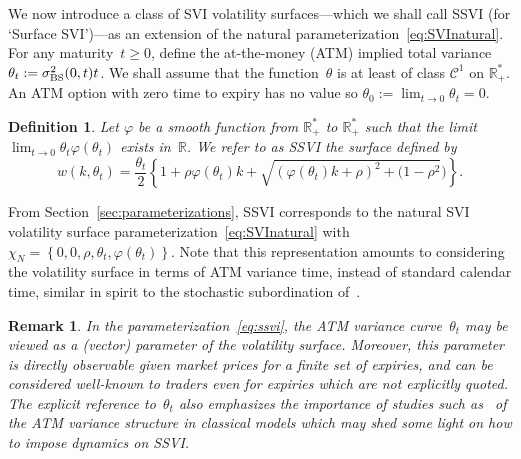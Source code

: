 \documentclass[12pt]{article}
\newtheorem{definition}{Definition}[section]
\newtheorem{remark}{Remark}[section]
\numberwithin{equation}{section}
\newcommand{\R}{\mathbb{R}}
\newcommand{\BS}{\rm BS}
\newcommand{\beq}{\begin{equation}}
\newcommand{\eeq}{\end{equation}}
\begin{document}
We now introduce a class of SVI volatility surfaces---which we shall call SSVI (for `Surface SVI')---as 
an extension of the natural parameterization~\eqref{eq:SVInatural}.
For any maturity~$t\geq 0$, define the at-the-money (ATM) implied total variance~$\theta_t:=\sigma_{\BS}^2(0,t)t$.
We shall assume that the function~$\theta$ is at least of class $\mathcal{C}^1$ on $\R_+^*$.
An ATM option with zero time to expiry has no value so $\theta_0:=\lim_{t\to 0}\theta_t=0$.
\begin{definition}
Let $\varphi$ be a smooth function from $\R_+^*$ to $\R_+^*$  such that the limit 
$\lim_{t\to 0}\theta_t\varphi(\theta_t)$ exists in~$\mathbb{R}$.
We refer to as {\em SSVI} the surface defined by
\beq\label{eq:ssvi}
w(k,\theta_t)
= \frac{\theta_t}{2}\left\{1+\rho\varphi(\theta_t) k + \sqrt{\left(\varphi(\theta_t){k}+\rho\right)^2
+(1-\rho^2 })\right\}.
\eeq
\end{definition}
From Section~\ref{sec:parameterizations}, SSVI corresponds to 
the natural SVI volatility surface parameterization~\eqref{eq:SVInatural} with
$\chi_N = \left\{0,0,\rho,\theta_t,\varphi(\theta_t)\right\}$.
Note that this representation amounts to considering the volatility surface in terms of ATM variance time, instead of standard calendar time, similar in spirit to the stochastic subordination of~\cite{Clark}.

\begin{remark}
In the parameterization~\eqref{eq:ssvi}, the ATM variance curve~$\theta_t$ may be viewed as a (vector) parameter of the volatility surface.  
Moreover, this parameter is directly observable given market prices for a finite set of expiries, and can be considered well-known to traders even for expiries which are not explicitly quoted.
The explicit reference to~$\theta_t$ also emphasizes the importance of studies such as~\cite{DeMarco} of the ATM variance structure in classical models which may shed some light on how to impose dynamics on SSVI.
\end{remark}
\end{document}
